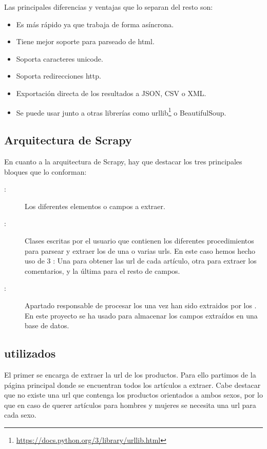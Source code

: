 Las principales diferencias y ventajas que lo separan del resto son:
\begin{itemize}
    \item Es más rápido ya que trabaja de forma asíncrona.
    \item Tiene mejor soporte para parseado de html.
    \item Soporta caracteres unicode.
    \item Soporta redirecciones http.
    \item Exportación directa de los resultados a JSON, CSV o XML.
    \item Se puede usar junto a otras librerías como urllib\footnote{\url{https://docs.python.org/3/library/urllib.html}} o BeautifulSoup.
\end{itemize}

\subsection{Arquitectura de Scrapy}

En cuanto a la arquitectura de Scrapy, hay que destacar los tres principales bloques que lo conforman:

\begin{description}
    \item[:] Los diferentes elementos o campos a extraer.
    \item[:] Clases escritas por el usuario que contienen los diferentes procedimientos para parsear y extraer los  de una o varias urls. En este caso hemos hecho uso de 3 : Una para obtener las url de cada artículo, otra para extraer los comentarios, y la última para el resto de campos.
    \item[:] Apartado responsable de procesar los  una vez han sido extraidos por los . En este proyecto se ha usado para almacenar los campos extraídos en una base de datos.
\end{description}


\subsection{ utilizados}
El primer  se encarga de extraer la url de los productos. Para ello partimos de la página principal donde se encuentran todos los artículos a extraer. Cabe destacar que no existe una url que contenga los productos orientados a ambos sexos, por lo que en caso de querer artículos para hombres y mujeres se necesita una url para cada sexo.

